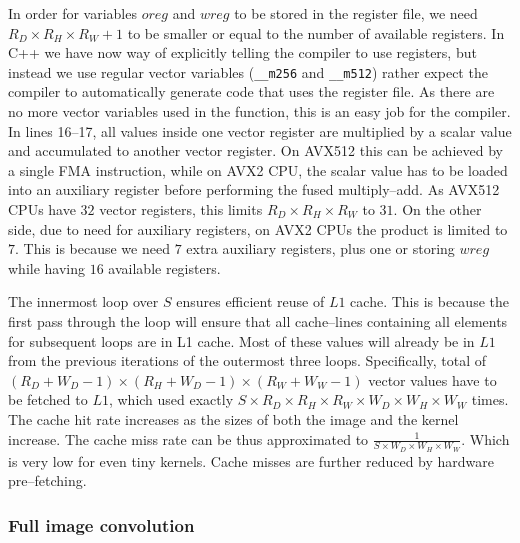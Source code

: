   In order for variables $oreg$ and $wreg$ to be stored in the
  register file, we need $R_D \times R_H \times R_W + 1$ to be smaller
  or equal to the number of available registers.  In C++ we have now
  way of explicitly telling the compiler to use registers, but instead
  we use regular vector variables (\texttt{\_\_m256} and
  \texttt{\_\_m512}) rather expect the compiler to automatically
  generate code that uses the register file.  As there are no more
  vector variables used in the function, this is an easy job for the
  compiler.  In lines 16--17, all values inside one vector register
  are multiplied by a scalar value and accumulated to another vector
  register.  On AVX512 this can be achieved by a single FMA
  instruction, while on AVX2 CPU, the scalar value has to be loaded
  into an auxiliary register before performing the fused
  multiply--add.  As AVX512 CPUs have $32$ vector registers, this
  limits $R_D \times R_H \times R_W$ to $31$.  On the other side, due
  to need for auxiliary registers, on AVX2 CPUs the product is limited
  to $7$.  This is because we need $7$ extra auxiliary registers, plus
  one or storing $wreg$ while having $16$ available registers.

  The innermost loop over $S$ ensures efficient reuse of $L1$ cache.
  This is because the first pass through the loop will ensure that all
  cache--lines containing all elements for subsequent loops are in L1
  cache.  Most of these values will already be in $L1$ from the
  previous iterations of the outermost three loops.  Specifically,
  total of $(R_D+W_D-1) \times (R_H+W_D-1) \times (R_W+W_W-1)$ vector
  values have to be fetched to $L1$, which used exactly $S \times R_D
  \times R_H \times R_W \times W_D \times W_H \times W_W$ times.  The
  cache hit rate increases as the sizes of both the image and the
  kernel increase.  The cache miss rate can be thus approximated to
  $\frac{1}{S \times W_D \times W_H \times W_W}$.  Which is very low
  for even tiny kernels.  Cache misses are further reduced by hardware
  pre--fetching.

  \subsubsection{Full image convolution}

